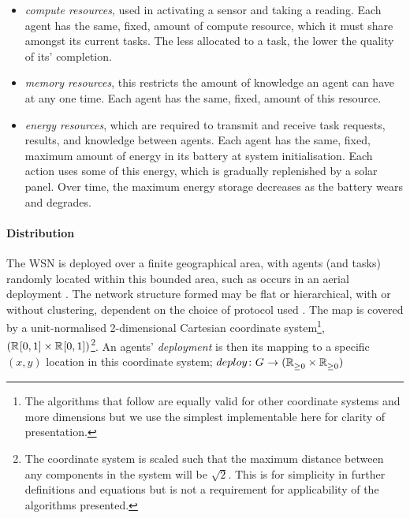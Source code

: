 \begin{itemize}
	\item \textit{compute resources}, used in activating a sensor and taking a reading. Each agent has the same, fixed, amount of compute resource, which it must share amongst its current tasks. The less allocated to a task, the lower the quality of its' completion. 
	\item \textit{memory resources}, this restricts the amount of knowledge an agent can have at any one time. Each agent has the same, fixed, amount of this resource.
	\item \textit{energy resources}, which are required to transmit and receive task requests, results, and knowledge between agents. Each agent has the same, fixed, maximum amount of energy in its battery at system initialisation. Each action uses some of this energy, which is gradually replenished by a solar panel. Over time, the maximum energy storage decreases as the battery wears and degrades.
\end{itemize}


\newcommand{\formalDeployment}[2]{\functionFormal{deploy}{\setAgents{}{}}{(\setRealNumbersNonNegative{}{} \times \setRealNumbersNonNegative{}{})}}
\newcommand{\functionDeployment}[2]{
	\ifx \\1\\
	\functionSignature{deploy}{\setAgents{}{}}
	\else
	\functionSignature{deploy}{#1}
	\fi
}

\newcommand{\formalTransmissionRange}[2]{
	\functionFormal{range}
	{\powerSetAgents{}{} \times (\setRealNumbersNonNegative{}{} \times \setRealNumbersNonNegative{}{})}
	{\setRealNumbersNonNegative{}{}}
}
\newcommand{\functionTransmissionRange}[2]{\functionSignature{range}{\setAgents{}{}}}
\paragraph{Distribution}
\label{section:task_and_resources:distribution}
The WSN is deployed over a finite geographical area, with agents (and tasks) randomly located within this bounded area, such as occurs in an aerial deployment \citep{Kumar2013}.  The network structure formed may be flat or hierarchical, with or without clustering, dependent on the choice of protocol used \citep{Carlos-Mancilla2016b}. The map is covered by a unit-normalised 2-dimensional Cartesian coordinate system\footnote{The algorithms that follow are equally valid for other coordinate systems and more dimensions but we use the simplest implementable here for clarity of presentation.},  $(\mathbb{R}_{}^{}[0,1] \times \mathbb{R}_{}^{}[0,1])$\footnote{The coordinate system is scaled such that the maximum distance between any components in the system will be $\sqrt{2}$. This is for simplicity in further definitions and equations but is not a requirement for applicability of the algorithms presented.}. An agents' \textit{deployment} is then its mapping to a specific $(x, y)$ location in this coordinate system; $\formalDeployment{}{}$

